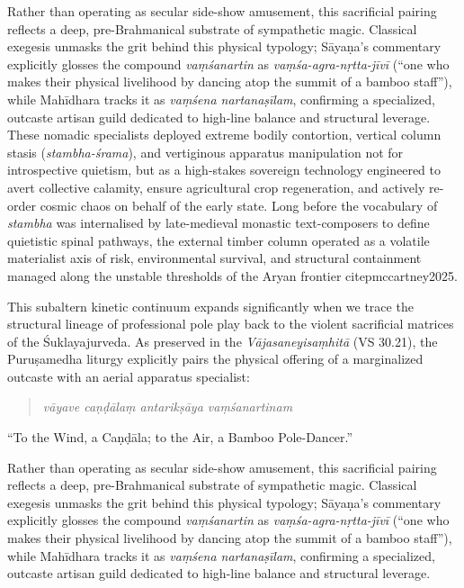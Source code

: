 \documentclass[11pt,twoside,letterpaper]{article}
\begin{document}
Rather than operating as secular side-show amusement, this sacrificial pairing reflects a deep, pre-Brahmanical substrate of sympathetic magic. Classical exegesis unmasks the grit behind this physical typology; Sāyaṇa's commentary explicitly glosses the compound \textit{vaṃśanartin} as \textit{vaṃśa-agra-nṛtta-jīvī} (``one who makes their physical livelihood by dancing atop the summit of a bamboo staff''), while Mahīdhara tracks it as \textit{vaṃśena nartanaṣīlam}, confirming a specialized, outcaste artisan guild dedicated to high-line balance and structural leverage. These nomadic specialists deployed extreme bodily contortion, vertical column stasis (\textit{stambha-śrama}), and vertiginous apparatus manipulation not for introspective quietism, but as a high-stakes sovereign technology engineered to avert collective calamity, ensure agricultural crop regeneration, and actively re-order cosmic chaos on behalf of the early state. Long before the vocabulary of \textit{stambha} was internalised by late-medieval monastic text-composers to define quietistic spinal pathways, the external timber column operated as a volatile materialist axis of risk, environmental survival, and structural containment managed along the unstable thresholds of the Aryan frontier citep{mccartney2025}.

This subaltern kinetic continuum expands significantly when we trace the structural 
lineage of professional pole play back to the violent sacrificial matrices of the 
Śuklayajurveda. As preserved in the \textit{Vājasaneyisaṃhitā} (VS 30.21), the Puruṣamedha liturgy explicitly pairs the physical offering of a marginalized outcaste with an aerial apparatus specialist: 

\begin{quote}
\textit{vāyave caṇḍālaṃ antarikṣāya vaṃśanartinam}
\end{quote}
``To the Wind, a Caṇḍāla; to the Air, a Bamboo Pole-Dancer.'' 

Rather than operating as secular side-show amusement, this sacrificial pairing reflects a deep, pre-Brahmanical substrate of sympathetic magic. Classical exegesis unmasks the grit behind this physical typology; Sāyaṇa's commentary explicitly glosses the compound \textit{vaṃśanartin} as \textit{vaṃśa-agra-nṛtta-jīvī} (``one who makes their physical livelihood by dancing atop the summit of a bamboo staff''), while Mahīdhara tracks it as \textit{vaṃśena nartanaṣīlam}, confirming a specialized, outcaste artisan guild dedicated to high-line balance and structural leverage. 
\end{document}
